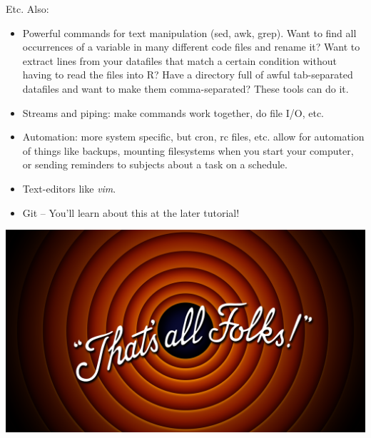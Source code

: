 \documentclass{beamer}
\begin{document}
\begin{frame}{Etc.}
Also:
\begin{itemize}
\item Powerful commands for text manipulation (sed, awk, grep). Want to find all occurrences of a variable in many different code files and rename it? Want to extract lines from your datafiles that match a certain condition without having to read the files into R? Have a directory full of awful tab-separated datafiles and want to make them comma-separated? These tools can do it. 
\item Streams and piping: make commands work together, do file I/O, etc.   
\item Automation: more system specific, but cron, rc files, etc. allow for automation of things like backups, mounting filesystems when you start your computer, or sending reminders to subjects about a task on a schedule.
\item Text-editors like \emph{vim}.
\item Git -- You'll learn about this at the later tutorial!
\end{itemize}
\end{frame}

\begin{frame}
\includegraphics[width = \textwidth]{images/thatsallfolks.png}
\end{frame}
\end{document}

